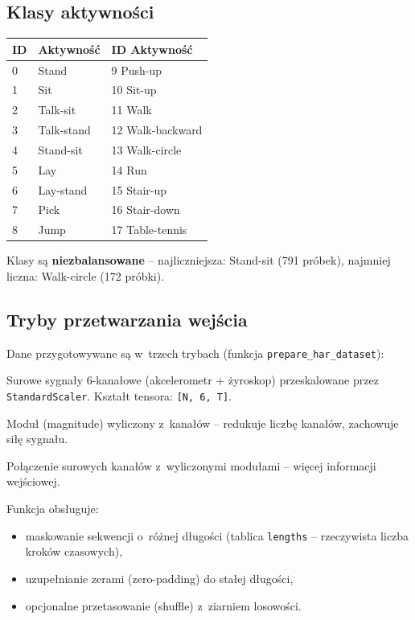 \documentclass[12pt,a4paper]{article}
\begin{document}
\subsection{Klasy aktywności}
\begin{center}
\begin{tabular}{@{}lll@{}}
\toprule
ID & Aktywność & ID \quad Aktywność \\
\midrule
0  & Stand        & 9  \quad Push-up \\
1  & Sit          & 10 \quad Sit-up \\
2  & Talk-sit     & 11 \quad Walk \\
3  & Talk-stand   & 12 \quad Walk-backward \\
4  & Stand-sit    & 13 \quad Walk-circle \\
5  & Lay          & 14 \quad Run \\
6  & Lay-stand    & 15 \quad Stair-up \\
7  & Pick         & 16 \quad Stair-down \\
8  & Jump         & 17 \quad Table-tennis \\
\bottomrule
\end{tabular}
\end{center}

Klasy są \textbf{niezbalansowane} -- najliczniejsza: Stand-sit (791 próbek), najmniej liczna: Walk-circle (172 próbki).

\subsection{Tryby przetwarzania wejścia}

Dane przygotowywane są w~trzech trybach (funkcja \texttt{prepare\_har\_dataset}):

\begin{description}[leftmargin=3cm, style=nextline]
  \item[\texttt{raw}]    Surowe sygnały 6-kanałowe (akcelerometr + żyroskop) przeskalowane przez \texttt{StandardScaler}. Kształt tensora: \texttt{[N, 6, T]}.
  \item[\texttt{mag}]    Moduł (magnitude) wyliczony z~kanałów -- redukuje liczbę kanałów, zachowuje siłę sygnału.
  \item[\texttt{hybrid}] Połączenie surowych kanałów z~wyliczonymi modułami -- więcej informacji wejściowej.
\end{description}

Funkcja obsługuje:
\begin{itemize}
  \item maskowanie sekwencji o~różnej długości (tablica \texttt{lengths} -- rzeczywista liczba kroków czasowych),
  \item uzupełnianie zerami (zero-padding) do stałej długości,
  \item opcjonalne przetasowanie (shuffle) z~ziarniem losowości.
\end{itemize}
\end{document}

